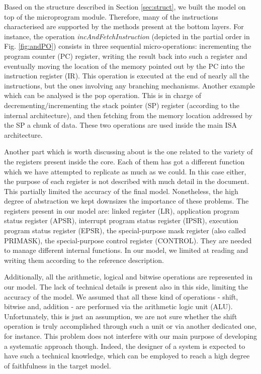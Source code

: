 \documentclass[conference]{IEEEtran}
\begin{document}
Based on the structure described in Section \ref{sec:struct}, we built the model on top of
the microprogram module. Therefore, many of the instructions characterised are supported by
the methods present at the bottom layers. For instance, the operation
\textit{incAndFetchInstruction} (depicted in the partial order in Fig. \ref{fig:andPO})
consists in three sequential micro-operations: incrementing the program counter (PC)
register, writing the result back into such a register and eventually moving the location of
the memory pointed out by the PC into the instruction register (IR). This operation is
executed at the end of nearly all the instructions, but the ones involving any branching
mechanisms. Another example which can be analysed is the pop operation. This is in charge of
decrementing/incrementing the stack pointer (SP) register (according to the internal
architecture), and then fetching from the memory location addressed by the SP a chunk of 
data. These two operations are used inside the main ISA architecture.

Another part which is worth discussing about is the one related to the variety of the
registers present inside the core. Each of them has got a different function which we have
attempted to replicate as much as we could. In this case either, the purpose of each register
is not described with much detail in the document. This partially limited the accuracy of the
final model. Nonetheless, the high degree of abstraction we kept downsizes the importance of
these problems. The registers present in our model are: linked register (LR), application
program status register (APSR), interrupt program status register (IPSR), execution program
status register (EPSR), the special-purpose mask register (also called PRIMASK), the special-purpose control register (CONTROL). They are needed to manage different internal functions.
In our model, we limited at reading and writing them according to the reference description.

Additionally, all the arithmetic, logical and bitwise operations are represented in our
model. The lack of technical details is present also in this side, limiting the accuracy of
the model. We assumed that all these kind of operations - shift, bitwise and, addition - are
performed via the arithmetic logic unit (ALU). Unfortunately, this is just an
assumption, we are not sure whether the shift operation is truly accomplished
through such a unit  or via another dedicated one, for instance.
This problem does not interfere with our main purpose of
developing a systematic approach though. Indeed, the designer of a system is expected to have
such a technical knowledge, which can be employed to reach a high degree of faithfulness in
the target model.
\end{document}
